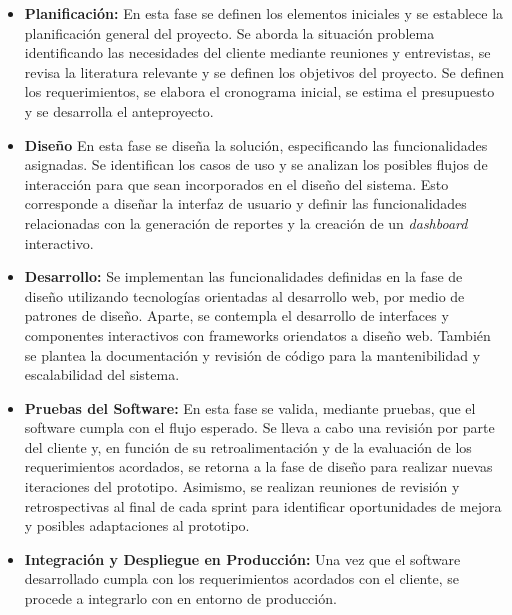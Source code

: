 \documentclass[spanish]{ieee_upb}
\begin{document}
\begin{itemize}
  \item \textbf{Planificación: }En esta fase se definen los elementos iniciales y se establece la planificación general del proyecto. 
Se aborda la situación problema identificando las necesidades del cliente mediante
 reuniones y entrevistas, se revisa la literatura relevante y se definen los objetivos 
 del proyecto. Se definen los requerimientos, se elabora el cronograma inicial, 
 se estima el presupuesto y se desarrolla el anteproyecto.
 \item \textbf{Diseño }En esta fase se diseña la solución, especificando las funcionalidades asignadas.
 Se identifican los casos de uso y se analizan los posibles flujos 
 de interacción para que sean incorporados en el diseño del sistema.
 Esto corresponde a diseñar la interfaz de usuario y definir las 
 funcionalidades relacionadas con la generación de reportes y 
 la creación de un \textit{dashboard} interactivo.
 \item \textbf{Desarrollo: }Se implementan las funcionalidades definidas en la fase de diseño utilizando 
tecnologías orientadas al desarrollo web, por medio de patrones de diseño. 
Aparte, se contempla el desarrollo de interfaces y componentes interactivos 
con frameworks oriendatos a diseño web. 
También se plantea la documentación y
revisión de código para la mantenibilidad y escalabilidad del sistema.
 \item \textbf{Pruebas del Software: }En esta fase se valida, mediante pruebas, 
que el software cumpla con el flujo esperado. 
Se lleva a cabo una revisión por parte del cliente y, 
en función de su retroalimentación y de la evaluación 
de los requerimientos acordados, se retorna a la fase 
de diseño para realizar nuevas iteraciones del prototipo. 
Asimismo, se realizan reuniones de revisión y 
retrospectivas al final de cada sprint para identificar oportunidades de 
mejora y posibles adaptaciones al prototipo.
 \item \textbf{Integración y Despliegue en Producción: }Una vez que el software 
 desarrollado cumpla con los requerimientos acordados con el cliente, 
se procede a integrarlo con en entorno de producción.
\end{itemize}



\end{document}
